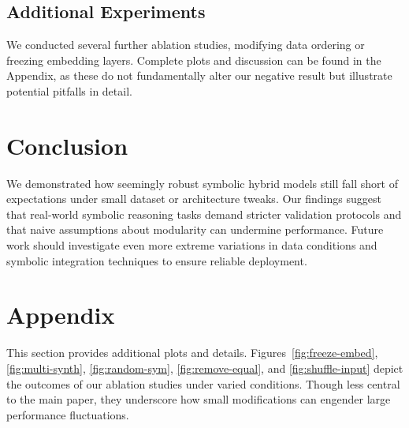 \documentclass{article}
\begin{document}
\subsection{Additional Experiments}
We conducted several further ablation studies, modifying data ordering or freezing embedding layers. Complete plots and discussion can be found in the Appendix, as these do not fundamentally alter our negative result but illustrate potential pitfalls in detail.

\section{Conclusion}
We demonstrated how seemingly robust symbolic hybrid models still fall short of expectations under small dataset or architecture tweaks. Our findings suggest that real-world symbolic reasoning tasks demand stricter validation protocols and that naive assumptions about modularity can undermine performance. Future work should investigate even more extreme variations in data conditions and symbolic integration techniques to ensure reliable deployment.




\clearpage
\appendix
\section{Appendix}
This section provides additional plots and details. Figures~\ref{fig:freeze-embed}, \ref{fig:multi-synth}, \ref{fig:random-sym}, \ref{fig:remove-equal}, and \ref{fig:shuffle-input} depict the outcomes of our ablation studies under varied conditions. Though less central to the main paper, they underscore how small modifications can engender large performance fluctuations.
\end{document}
